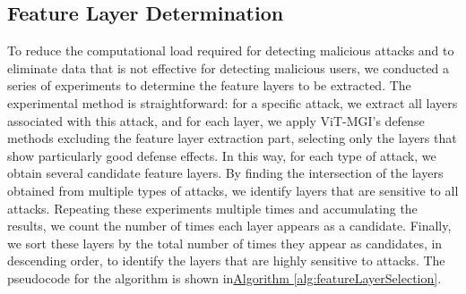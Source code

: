 \documentclass[conference]{IEEEtran}
\begin{document}
\subsection{Feature Layer Determination}
\label{exp:exp_layer}


To reduce the computational load required for detecting malicious attacks and to eliminate data that is not effective for detecting malicious users, we conducted a series of experiments to determine the feature layers to be extracted. The experimental method is straightforward: for a specific attack, we extract all layers associated with this attack, and for each layer, we apply ViT-MGI's defense methods excluding the feature layer extraction part, selecting only the layers that show particularly good defense effects. In this way, for each type of attack, we obtain several candidate feature layers. By finding the intersection of the layers obtained from multiple types of attacks, we identify layers that are sensitive to all attacks. Repeating these experiments multiple times and accumulating the results, we count the number of times each layer appears as a candidate. Finally, we sort these layers by the total number of times they appear as candidates, in descending order, to identify the layers that are highly sensitive to attacks. The pseudocode for the algorithm is shown in\hyperref[alg:featureLayerSelection]{Algorithm \ref{alg:featureLayerSelection}}.

    
\end{document}
